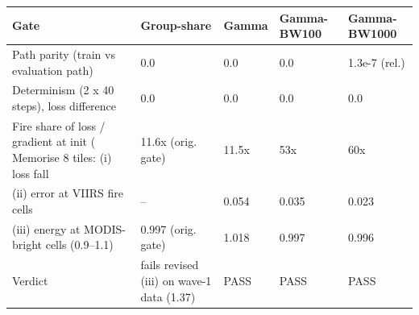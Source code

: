 \begin{tabular}{lllll}
\toprule
Gate & Group-share & Gamma & Gamma-BW100 & Gamma-BW1000 \\
\midrule
Path parity (train vs evaluation path) & 0.0 & 0.0 & 0.0 & 1.3e-7 (rel.) \\
Determinism (2 x 40 steps), loss difference & 0.0 & 0.0 & 0.0 & 0.0 \\
Fire share of loss / gradient at init (%
Memorise 8 tiles: (i) loss fall & 11.6x (orig. gate) & 11.5x & 53x & 60x \\
(ii) error at VIIRS fire cells & -- & 0.054 & 0.035 & 0.023 \\
(iii) energy at MODIS-bright cells (0.9--1.1) & 0.997 (orig. gate) & 1.018 & 0.997 & 0.996 \\
Verdict & fails revised (iii) on wave-1 data (1.37) & PASS & PASS & PASS \\
\bottomrule
\end{tabular}
